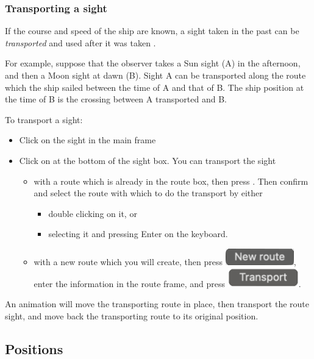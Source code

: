 \documentclass{ol-softwaremanual}
\begin{document}
\subsubsection{Transporting a sight}\label{section-transporting-sight}

If the course and speed of the ship are known, a sight taken in the past can be \textit{transported} and used after it was taken \cite{bowditch2002the,noauthor2017cours}. 

For example, suppose that the observer takes a Sun sight (A) in the afternoon, and then a Moon sight at dawn (B). Sight A can be transported along the route which the ship sailed between the time of A and that of B. The ship position at the time of B is the crossing between A transported and B. 

To transport a sight: 
\begin{itemize}
\item Click on the sight in the main frame
\item Click on  at the bottom of the sight box. You can transport the sight
\begin{itemize}
\item with a route which is already in the route box, then press . Then confirm and select the route with which to do the transport by either
\begin{itemize}
  \item double clicking on it, or
  \item selecting it and pressing Enter on the keyboard. 
\end{itemize}
\item with a new route which you will create, then press \includegraphics{figures/new-route-button.png}, enter the information in the route frame, and press \includegraphics{figures/routeframe-transport-button.png}. 
\end{itemize}
\end{itemize}
An animation will move the transporting route in place, then transport the route sight, and move back the transporting route to its original position. 


\subsection{Positions}\label{section-position}
\end{document}
